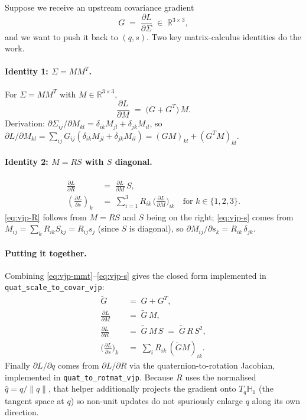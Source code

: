 \documentclass[11pt]{article}
\newcommand{\R}{\mathbb{R}}
\newcommand{\HQ}{\mathbb{H}}
\begin{document}
Suppose we receive an upstream covariance gradient
\begin{equation}
  G \;=\; \frac{\partial L}{\partial \Sigma} \;\in\; \R^{3 \times 3},
\end{equation}
and we want to push it back to $(q, s)$. Two key matrix-calculus
identities do the work.

\paragraph{Identity 1: \texorpdfstring{$\Sigma = M M^{T}$}{Sigma = M M\^{}T}.}
For $\Sigma = M M^{T}$ with $M \in \R^{3 \times 3}$,
\begin{equation}
  \frac{\partial L}{\partial M} \;=\; \bigl(G + G^{T}\bigr)\, M.
  \label{eq:vjp-mmt}
\end{equation}
Derivation: $\partial \Sigma_{ij} / \partial M_{kl} =
\delta_{ik} M_{jl} + \delta_{jk} M_{il}$, so
$\partial L / \partial M_{kl} = \sum_{ij} G_{ij}
(\delta_{ik} M_{jl} + \delta_{jk} M_{il})
= (GM)_{kl} + (G^{T} M)_{kl}$.

\paragraph{Identity 2: \texorpdfstring{$M = R S$}{M = R S} with \texorpdfstring{$S$}{S} diagonal.}
\begin{align}
  \frac{\partial L}{\partial R} &\;=\;
  \frac{\partial L}{\partial M}\, S, \label{eq:vjp-R}\\
  \left(\frac{\partial L}{\partial s}\right)_{k} &\;=\;
  \sum_{i = 1}^{3} R_{ik}\, \biggl(\frac{\partial L}{\partial M}\biggr)_{ik}
  \quad \text{for } k \in \{1, 2, 3\}. \label{eq:vjp-s}
\end{align}
\eqref{eq:vjp-R} follows from $M = R S$ and $S$ being on the right;
\eqref{eq:vjp-s} comes from $M_{ij} = \sum_{k} R_{ik} S_{kj}
= R_{ij} s_{j}$ (since $S$ is diagonal), so
$\partial M_{ij} / \partial s_{k} = R_{ik}\, \delta_{jk}$.

\paragraph{Putting it together.}
Combining \eqref{eq:vjp-mmt}--\eqref{eq:vjp-s} gives the closed form
implemented in \texttt{quat\_scale\_to\_covar\_vjp}:
\begin{align}
  \widetilde G &\;=\; G + G^{T}, \\
  \frac{\partial L}{\partial M} &\;=\; \widetilde G \, M, \\
  \frac{\partial L}{\partial R} &\;=\; \widetilde G \, M \, S \;=\; \widetilde G \, R \, S^{2}, \\
  \biggl(\frac{\partial L}{\partial s}\biggr)_{k} &\;=\; \sum_{i} R_{ik} \,(\widetilde G M)_{ik}.
\end{align}
Finally $\partial L / \partial q$ comes from $\partial L / \partial R$
via the quaternion-to-rotation Jacobian, implemented in
\texttt{quat\_to\_rotmat\_vjp}. Because $R$ uses the normalised
$\hat q = q / \lVert q \rVert$, that helper additionally projects
the gradient onto $T_{q}\HQ_{1}$ (the tangent space at $q$) so
non-unit updates do not spuriously enlarge $q$ along its own
direction.
\end{document}
